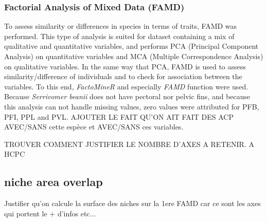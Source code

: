 \subsubsection{Factorial Analysis of Mixed Data (FAMD)}
To assess similarity or differences in species in terms of traits, FAMD was performed. This type of analysis is suited for dataset containing a mix of qualitative and quantitative variables, and performs PCA (Principal Component Analysis) on quantitative variables and MCA (Multiple Correspondence Analysis) on qualitative variables. In the same way that PCA, FAMD is used to assess similarity/difference of individuals and to check for association between the variables. To this end, \emph{FactoMineR} and especially \emph{FAMD} function were used. Because \textit{Serrivomer beanii} does not have pectoral nor pelvic fins, and because this analysis can not handle missing values, zero values were attributed for \textsc{PFB}, \textsc{PFI}, \textsc{PPL} and \textsc{PVL}. AJOUTER LE FAIT QU'ON AIT FAIT DES ACP AVEC/SANS cette espèce et AVEC/SANS ces variables.

 TROUVER COMMENT JUSTIFIER LE NOMBRE D'AXES A RETENIR. A HCPC 


 \subsection{niche area overlap}
 Justifier qu'on calcule la surface des niches sur la 1ere FAMD car ce sont les axes qui portent le + d'infos etc... 